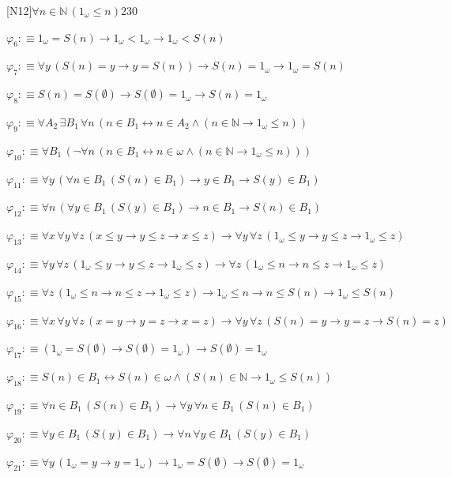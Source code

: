\begin{fullproof}{[N12]}{$\forall n \in \mathbb{N}\,(1_{\omega} \leq n)$}{230}
\begin{abbrevlist}
\item $\varphi_{6} :\equiv 1_{\omega} = S(n) \to 1_{\omega} < 1_{\omega} \to 1_{\omega} < S(n)$
\item $\varphi_{7} :\equiv \forall y\,(S(n) = y \to y = S(n)) \to S(n) = 1_{\omega} \to 1_{\omega} = S(n)$
\item $\varphi_{8} :\equiv S(n) = S(\emptyset) \to S(\emptyset) = 1_{\omega} \to S(n) = 1_{\omega}$
\item $\varphi_{9} :\equiv \forall A_{2}\,\exists B_{1}\,\forall n\,(n \in B_{1} \leftrightarrow n \in A_{2} \land (n \in \mathbb{N} \to 1_{\omega} \leq n))$
\item $\varphi_{10} :\equiv \forall B_{1}\,(\neg \forall n\,(n \in B_{1} \leftrightarrow n \in \omega \land (n \in \mathbb{N} \to 1_{\omega} \leq n)))$
\item $\varphi_{11} :\equiv \forall y\,(\forall n \in B_{1}\,(S(n) \in B_{1}) \to y \in B_{1} \to S(y) \in B_{1})$
\item $\varphi_{12} :\equiv \forall n\,(\forall y \in B_{1}\,(S(y) \in B_{1}) \to n \in B_{1} \to S(n) \in B_{1})$
\item $\varphi_{13} :\equiv \forall x\,\forall y\,\forall z\,(x \leq y \to y \leq z \to x \leq z) \to \forall y\,\forall z\,(1_{\omega} \leq y \to y \leq z \to 1_{\omega} \leq z)$
\item $\varphi_{14} :\equiv \forall y\,\forall z\,(1_{\omega} \leq y \to y \leq z \to 1_{\omega} \leq z) \to \forall z\,(1_{\omega} \leq n \to n \leq z \to 1_{\omega} \leq z)$
\item $\varphi_{15} :\equiv \forall z\,(1_{\omega} \leq n \to n \leq z \to 1_{\omega} \leq z) \to 1_{\omega} \leq n \to n \leq S(n) \to 1_{\omega} \leq S(n)$
\item $\varphi_{16} :\equiv \forall x\,\forall y\,\forall z\,(x = y \to y = z \to x = z) \to \forall y\,\forall z\,(S(n) = y \to y = z \to S(n) = z)$
\item $\varphi_{17} :\equiv (1_{\omega} = S(\emptyset) \to S(\emptyset) = 1_{\omega}) \to S(\emptyset) = 1_{\omega}$
\item $\varphi_{18} :\equiv S(n) \in B_{1} \leftrightarrow S(n) \in \omega \land (S(n) \in \mathbb{N} \to 1_{\omega} \leq S(n))$
\item $\varphi_{19} :\equiv \forall n \in B_{1}\,(S(n) \in B_{1}) \to \forall y\,\forall n \in B_{1}\,(S(n) \in B_{1})$
\item $\varphi_{20} :\equiv \forall y \in B_{1}\,(S(y) \in B_{1}) \to \forall n\,\forall y \in B_{1}\,(S(y) \in B_{1})$
\item $\varphi_{21} :\equiv \forall y\,(1_{\omega} = y \to y = 1_{\omega}) \to 1_{\omega} = S(\emptyset) \to S(\emptyset) = 1_{\omega}$

\end{abbrevlist}
\end{fullproof}
